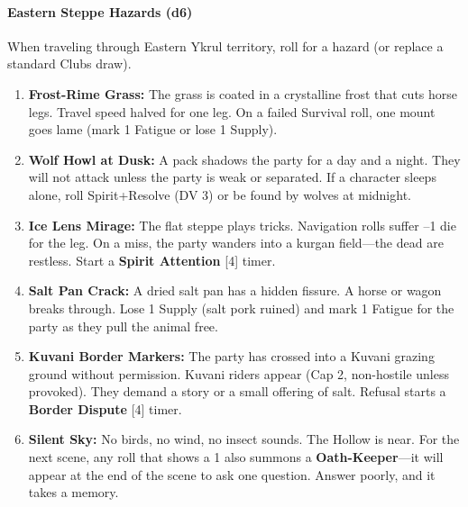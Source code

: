 \paragraph{Eastern Steppe Hazards (d6)}
When traveling through Eastern Ykrul territory, roll for a hazard (or replace a standard Clubs draw).
\begin{enumerate}
  \item \textbf{Frost-Rime Grass:} The grass is coated in a crystalline frost that cuts horse legs. Travel speed halved for one leg. On a failed Survival roll, one mount goes lame (mark 1 Fatigue or lose 1 Supply).
  \item \textbf{Wolf Howl at Dusk:} A pack shadows the party for a day and a night. They will not attack unless the party is weak or separated. If a character sleeps alone, roll Spirit+Resolve (DV 3) or be found by wolves at midnight.
  \item \textbf{Ice Lens Mirage:} The flat steppe plays tricks. Navigation rolls suffer --1 die for the leg. On a miss, the party wanders into a kurgan field---the dead are restless. Start a \textbf{Spirit Attention} [4] timer.
  \item \textbf{Salt Pan Crack:} A dried salt pan has a hidden fissure. A horse or wagon breaks through. Lose 1 Supply (salt pork ruined) and mark 1 Fatigue for the party as they pull the animal free.
  \item \textbf{Kuvani Border Markers:} The party has crossed into a Kuvani grazing ground without permission. Kuvani riders appear (Cap 2, non-hostile unless provoked). They demand a story or a small offering of salt. Refusal starts a \textbf{Border Dispute} [4] timer.
  \item \textbf{Silent Sky:} No birds, no wind, no insect sounds. The Hollow is near. For the next scene, any roll that shows a 1 also summons a \textbf{Oath-Keeper}---it will appear at the end of the scene to ask one question. Answer poorly, and it takes a memory.
\end{enumerate}

